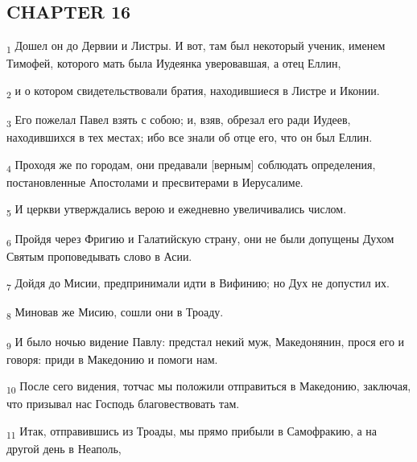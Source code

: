 \subsection{CHAPTER 16}
\begin{tcolorbox}
\textsubscript{1} Дошел он до Дервии и Листры. И вот, там был некоторый ученик, именем Тимофей, которого мать была Иудеянка уверовавшая, а отец Еллин,
\end{tcolorbox}
\begin{tcolorbox}
\textsubscript{2} и о котором свидетельствовали братия, находившиеся в Листре и Иконии.
\end{tcolorbox}
\begin{tcolorbox}
\textsubscript{3} Его пожелал Павел взять с собою; и, взяв, обрезал его ради Иудеев, находившихся в тех местах; ибо все знали об отце его, что он был Еллин.
\end{tcolorbox}
\begin{tcolorbox}
\textsubscript{4} Проходя же по городам, они предавали [верным] соблюдать определения, постановленные Апостолами и пресвитерами в Иерусалиме.
\end{tcolorbox}
\begin{tcolorbox}
\textsubscript{5} И церкви утверждались верою и ежедневно увеличивались числом.
\end{tcolorbox}
\begin{tcolorbox}
\textsubscript{6} Пройдя через Фригию и Галатийскую страну, они не были допущены Духом Святым проповедывать слово в Асии.
\end{tcolorbox}
\begin{tcolorbox}
\textsubscript{7} Дойдя до Мисии, предпринимали идти в Вифинию; но Дух не допустил их.
\end{tcolorbox}
\begin{tcolorbox}
\textsubscript{8} Миновав же Мисию, сошли они в Троаду.
\end{tcolorbox}
\begin{tcolorbox}
\textsubscript{9} И было ночью видение Павлу: предстал некий муж, Македонянин, прося его и говоря: приди в Македонию и помоги нам.
\end{tcolorbox}
\begin{tcolorbox}
\textsubscript{10} После сего видения, тотчас мы положили отправиться в Македонию, заключая, что призывал нас Господь благовествовать там.
\end{tcolorbox}
\begin{tcolorbox}
\textsubscript{11} Итак, отправившись из Троады, мы прямо прибыли в Самофракию, а на другой день в Неаполь,
\end{tcolorbox}
